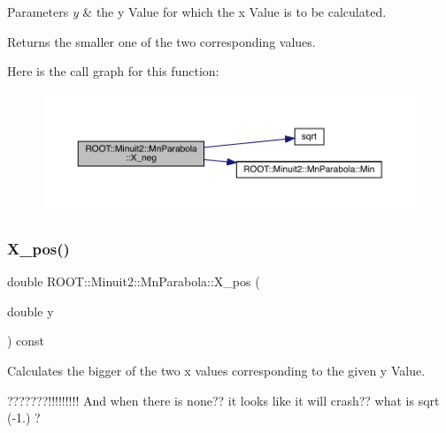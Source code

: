 \begin{DoxyParams}{Parameters}
{\em y} & the y Value for which the x Value is to be calculated.\\
\hline
\end{DoxyParams}
\begin{DoxyReturn}{Returns}
the smaller one of the two corresponding values. 
\end{DoxyReturn}
Here is the call graph for this function\+:
\nopagebreak
\begin{figure}[H]
\begin{center}
\leavevmode
\includegraphics[width=350pt]{db/d7d/classROOT_1_1Minuit2_1_1MnParabola_a16f7f02dd1cb070e89fb007331066ee3_cgraph}
\end{center}
\end{figure}
\mbox{\label{classROOT_1_1Minuit2_1_1MnParabola_a2b4623df00488ca3d4175eb92123066e}} 
\subsubsection{\texorpdfstring{X\_pos()}{X\_pos()}\hspace{0.1cm}{\footnotesize\ttfamily [1/2]}}
{\footnotesize\ttfamily double R\+O\+O\+T\+::\+Minuit2\+::\+Mn\+Parabola\+::\+X\+\_\+pos (\begin{DoxyParamCaption}\item[{double}]{y }\end{DoxyParamCaption}) const\hspace{0.3cm}{\ttfamily [inline]}}

Calculates the bigger of the two x values corresponding to the given y Value.

???????!!!!!!!!! And when there is none?? it looks like it will crash?? what is sqrt (-\/1.) ?


